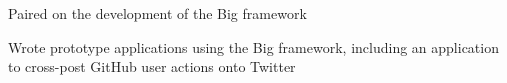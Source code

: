 \begin{job}

  \begin{accomplishments}
    \item Paired on the development of the Big framework
    \item Wrote prototype applications using the Big framework, including an
    application to cross-post GitHub user actions onto Twitter
  \end{accomplishments}
\end{job}
